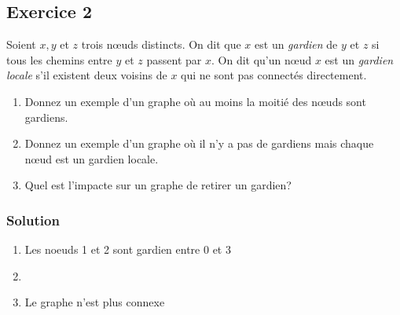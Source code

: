 \subsection*{Exercice 2}
Soient $x, y$ et $z$ trois n\oe{}uds distincts. On dit que $x$ est un \emph{gardien} de $y$ et $z$ si tous les chemins entre $y$ et $z$ passent par $x$.
On dit qu'un n\oe{}ud $x$ est un \emph{gardien locale} s'il existent deux voisins de $x$ qui ne sont pas connect\'{e}s directement.

\begin{enumerate}
\item Donnez un exemple d'un graphe o\`{u} au moins la moiti\'{e} des n\oe{}uds sont
gardiens.
\item Donnez un exemple d'un graphe o\`{u} il n'y a pas de gardiens mais chaque n\oe{}ud est un gardien locale.
\item Quel est l'impacte sur un graphe de retirer un gardien?
\end{enumerate}

\subsubsection*{Solution}
\begin{enumerate}
	\item Les noeuds 1 et 2 sont gardien entre 0 et 3

\begin{center}
\end{center}

	\item  \hspace{1em}
	\vspace{1em}

\begin{center}
\end{center}

	\item Le graphe n'est plus connexe
\end{enumerate}


